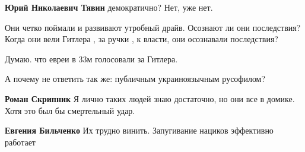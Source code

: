 \begin{itemize}
\begin{itemize}
\textbf{Юрий Николаевич Тявин} демократично? Нет, уже нет.

 

Они четко поймали и развивают утробный драйв. Осознают ли они последствия?
Когда они вели Гитлера , за ручки , к власти, они осознавали последствия?


 
Думаю. что евреи в 33м голосовали за Гитлера.
\end{itemize}

 
А почему не ответить так же: публичным украиноязычным русофилом?

\begin{itemize}
 
\textbf{Роман Скрипник} Я лично таких людей знаю достаточно, но они все в домике. Хотя это был бы смертельный удар.

 
\textbf{Евгения Бильченко}
Их трудно винить. Запугивание нациков эффективно работает

 

\end{itemize}
\end{itemize}

